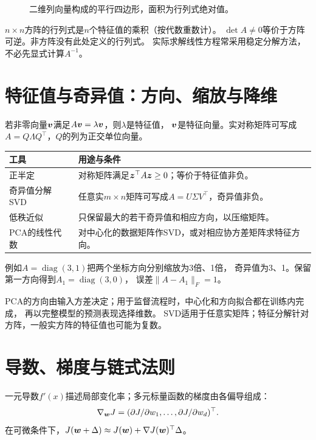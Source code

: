 \begin{figure}[htbp]
\centering
\caption{二维列向量构成的平行四边形，面积为行列式绝对值。}
\par\smallskip
{}
\end{figure}

$n\times n$方阵的行列式是$n$个特征值的乘积（按代数重数计）。
$\det A\ne0$等价于方阵可逆。非方阵没有此处定义的行列式。
实际求解线性方程常采用稳定分解方法，不必先显式计算$A^{-1}$。

\section{特征值与奇异值：方向、缩放与降维}
\label{sec:math-spectral}
若非零向量$\boldsymbol{v}$满足$A\boldsymbol{v}=\lambda\boldsymbol{v}$，则$\lambda$是特征值，
$\boldsymbol{v}$是特征向量。实对称矩阵可写成$A=Q\Lambda Q^\top$，$Q$的列为正交单位向量。

\begin{center}
\begin{tabularx}{\textwidth}{P{32mm}Y}
\toprule
工具 & 用途与条件\\
\midrule
正半定 & 对称矩阵满足$\boldsymbol{z}^\top A\boldsymbol{z}\geq0$；等价于特征值非负。\\
奇异值分解 SVD & 任意实$m\times n$矩阵可写成$A=U\Sigma V^\top$，奇异值非负。\\
低秩近似 & 只保留最大的若干奇异值和相应方向，以压缩矩阵。\\
PCA的线性代数 & 对中心化的数据矩阵作SVD，或对相应协方差矩阵求特征方向。\\
\bottomrule
\end{tabularx}
\end{center}

例如$A=\operatorname{diag}(3,1)$把两个坐标方向分别缩放为3倍、1倍，
奇异值为3、1。保留第一方向得到$A_1=\operatorname{diag}(3,0)$，
误差$\lVert A-A_1\rVert_F=1$。

PCA的方向由输入方差决定；用于监督流程时，中心化和方向拟合都在训练内完成，
再以完整模型的预测表现选择维数。
SVD适用于任意实矩阵；特征分解针对方阵，一般实方阵的特征值也可能为复数。

\section{导数、梯度与链式法则}
\label{sec:math-gradient}
一元导数$f'(x)$描述局部变化率；多元标量函数的梯度由各偏导组成：
\[
\nabla_{\boldsymbol{w}}J=(\partial J/\partial w_1,\ldots,\partial J/\partial w_d)^\top.
\]
在可微条件下，$J(\boldsymbol{w}+\Delta)\approx J(\boldsymbol{w})+\nabla J(\boldsymbol{w})^\top\Delta$。

